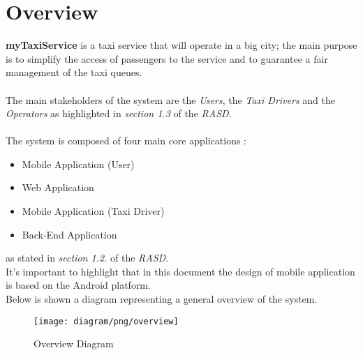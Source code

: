 \section{Overview} %
\label{sec:overview}
\textbf{myTaxiService} is a taxi service that will operate in a big city; the main purpose is to simplify the access of passengers to the service and to guarantee a fair management of the taxi queues.\\\\
The main stakeholders of the system are the \emph{Users}, the \emph{Taxi Drivers} and the \emph{Operators} as highlighted in \emph{section 1.3} of the \emph{RASD}.\\\\
The system is composed of four main core applications :
\begin{itemize}
	\item Mobile Application (User)
	\item Web Application
	\item Mobile Application (Taxi Driver)
	\item Back-End Application
\end{itemize}
 as stated in \emph{section 1.2.} of the \emph{RASD}.\\
 It's important to highlight that in this document the design of mobile application is based on the Android platform.\\
 Below is shown a diagram representing a general overview of the system.\\
\newpage
\vfill
\begin{figure}[h!t]
\caption{Overview Diagram}
\texttt{[image: diagram/png/overview]}
\centering
\end{figure}
\vfill
\clearpage

